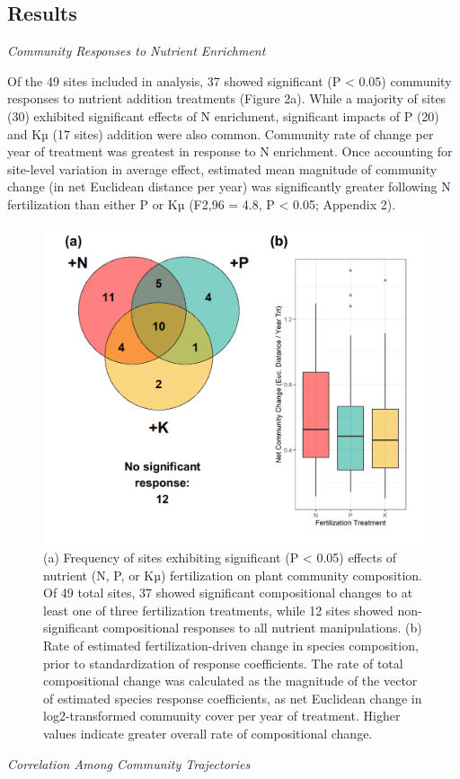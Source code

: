 \documentclass[twoside,12pt,final]{ucthesis-CA2012}
\begin{document}
\begin{ucmainmatter}
\hypertarget{results}{%
\section{Results}\label{results}}

\emph{Community Responses to Nutrient Enrichment}

Of the 49 sites included in analysis, 37 showed significant (P \textless{} 0.05) community responses to nutrient addition treatments (Figure 2a). While a majority of sites (30) exhibited significant effects of N enrichment, significant impacts of P (20) and Kµ (17 sites) addition were also common. Community rate of change per year of treatment was greatest in response to N enrichment. Once accounting for site-level variation in average effect, estimated mean magnitude of community change (in net Euclidean distance per year) was significantly greater following N fertilization than either P or Kµ (F2,96 = 4.8, P \textless{} 0.05; Appendix 2).
\begin{figure}
\centering
\includegraphics[width=\textwidth,height=0.6\textheight]{figure/Fig1_2.png}
\caption{\newline (a) Frequency of sites exhibiting significant (P \textless{} 0.05) effects of nutrient (N, P, or Kµ) fertilization on plant community composition. Of 49 total sites, 37 showed significant compositional changes to at least one of three fertilization treatments, while 12 sites showed non-significant compositional responses to all nutrient manipulations. \newline (b) Rate of estimated fertilization-driven change in species composition, prior to standardization of response coefficients. The rate of total compositional change was calculated as the magnitude of the vector of estimated species response coefficients, as net Euclidean change in log2-transformed community cover per year of treatment. Higher values indicate greater overall rate of compositional change. \label{fig-1-2}}
\end{figure}
\emph{Correlation Among Community Trajectories}


\end{ucmainmatter}
\end{document}
